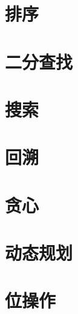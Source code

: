 \documentclass[oneside]{book}
\begin{document}
\begin{CJK}{UTF8}{gbsn}
%

%

\chapter{排序}


\chapter{二分查找}


%

\chapter{搜索}


\chapter{回溯}


\chapter{贪心}


\chapter{动态规划}


\chapter{位操作}


%

\end{CJK}
\end{document}
